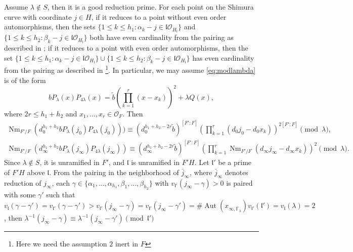 \documentclass{amsart}
\numberwithin{equation}{subsection}
\numberwithin{theorem}{section}
\theoremstyle{definition}
\theoremstyle{remark}
\newcommand{\bF}{\mathbb{F}}
\newcommand{\cO}{\mathcal{O}}
\DeclareMathOperator{\Nm}{Nm}
\DeclareMathOperator{\Aut}{Aut}
\begin{document}
Assume $\lambda\notin S$, then it is a good reduction prime. For each point on the Shimura curve with coordinate $j \in H$, if it reduces to a point without even order automorphisms, then the sets $\{1\leq k\leq h_1: \alpha_k-j \in \mathfrak{l}\cO_{H_{\mathfrak{l}}}\}$ and $\{1\leq k\leq h_2: \beta_k-j \in \mathfrak{l}\cO_{H_{\mathfrak{l}}}\}$ both have even cardinality from the pairing as described in ;  if it reduces to a point with even order automorphisms, then the set $\{1\leq k\leq h_1: \alpha_k-j \in \mathfrak{l}\cO_{H_{\mathfrak{l}}}\} \cup \{1\leq k\leq h_2: \beta_k-j \in \mathfrak{l}\cO_{H_{\mathfrak{l}}}\}$ has even cardinality from the pairing as described in \footnote{Here we need the assumption $2$ inert in $F$}. In particular, we may assume \eqref{eq:modlambda} is of the form \begin{equation}
    bP_{\lambda}(x) P_{4\lambda}(x) = \tilde{b} \left(\prod_{k=1}^{r}(x-x_k)\right)^2 +\lambda Q(x),
\end{equation} where $2r\leq h_1+h_2$ and $x_1, \dotsc, x_r \in \cO_F$. Then \begin{align*}
    \Nm_{F'/F}(d_0^{h_1+h_2} bP_{\lambda}(j_0)P_{4\lambda}(j_0)))  \equiv (d_0^{h_1+h_2-2r}\tilde{b})^{[F':F]}\left(  \prod_{k=1}^r (d_0j_0 - d_0x_k) \right)^{2[F':F]} \pmod \lambda, \\
    \Nm_{F'/F}(d_{\infty}^{h_1+h_2} bP_{\lambda}(j_{\infty})P_{4\lambda}(j_{\infty})) \equiv (d_{\infty}^{h_1+h_2-2r}\tilde{b})^{[F':F]} \left(\prod_{k=1}^{r}\Nm_{F'/F}(d_{\infty}j_{\infty}-d_{\infty}x_k)\right)^2 \pmod \lambda.
\end{align*}
Since $\lambda\notin S$, it is unramified in $F'$, and $\mathfrak{l}$ is unramified in $F'H$. Let $\mathfrak{l}'$ be a prime of $F'H$ above $\mathfrak{l}$. From the pairing in the neighborhood of $\bar{j}_{\infty}$, where $\bar{j}_{\infty}$ denotes reduction of $j_{\infty}$, 
each $\gamma\in \{\alpha_1, \dotsc, \alpha_{h_1},\beta_1, \dotsc, \beta_{h_2}\}$ with $v_{\mathfrak{l}'}(j_{\infty} - \gamma) >0$ is paired with some $\gamma'$ such that  $v_{\mathfrak{l}}(\gamma - \gamma') = v_{\mathfrak{l}'}(\gamma - \gamma') >  v_{\mathfrak{l}'}(j_\infty - \gamma) = v_{\mathfrak{l}'}(j_{\infty} - \gamma') = \#\Aut(x_{\infty, \overline{\bF}_\lambda})v_{\mathfrak{l}'}(\mathfrak{l}') =v_{\mathfrak{l}}(\lambda) = 2$, then $\lambda^{-1}(j_{\infty}-\gamma) \equiv \lambda^{-1} (j_{\infty} -\gamma') \pmod {\mathfrak{l}'}$
\fi
\end{document}
